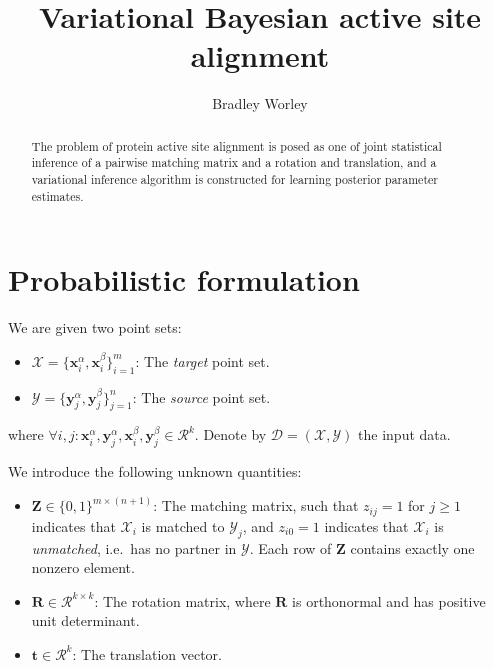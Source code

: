 \documentclass{article}
\newcommand{\m}[1]{\boldsymbol{#1}}
\newcommand{\setD}{\mathcal{D}}
\newcommand{\setR}{\mathcal{R}}
\newcommand{\setX}{\mathcal{X}}
\newcommand{\setY}{\mathcal{Y}}
\begin{document}
\title{Variational Bayesian active site alignment}
\author{Bradley Worley}
\maketitle

\begin{abstract}
The problem of protein active site alignment is posed
as one of joint statistical inference of a pairwise
matching matrix and a rotation and translation, and
a variational inference algorithm is constructed
for learning posterior parameter estimates.
\end{abstract}

\section{Probabilistic formulation}
We are given two point sets:
\begin{itemize}
 \item $\setX = \{ \m{x}_i^\alpha, \m{x}_i^\beta \}_{i=1}^m$:
  The \emph{target} point set.
 \item $\setY = \{ \m{y}_j^\alpha, \m{y}_j^\beta \}_{j=1}^n$:
  The \emph{source} point set.
\end{itemize}
where $\forall i,j:
 \m{x}_i^\alpha,\m{y}_j^\alpha,\m{x}_i^\beta,\m{y}_j^\beta \in \setR^k$.
Denote by $\setD = (\setX, \setY)$ the input data.

We introduce the following unknown quantities:
\begin{itemize}
 \item $\m{Z} \in \{0,1\}^{m \times (n + 1)}$: The matching matrix, such
  that $z_{ij} = 1$ for $j \ge 1$ indicates that $\setX_i$ is matched to
  $\setY_j$, and $z_{i0} = 1$ indicates that $\setX_i$ is
  \emph{unmatched}, i.e.~has no partner in $\setY$. Each row of $\m{Z}$
  contains exactly one nonzero element.
 \item $\m{R} \in \setR^{k \times k}$: The rotation matrix, where $\m{R}$
  is orthonormal and has positive unit determinant.
 \item $\m{t} \in \setR^k$: The translation vector.
\end{itemize}
\end{document}
